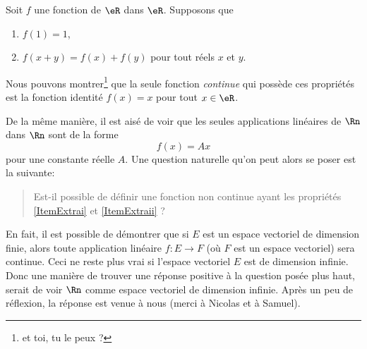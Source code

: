 Soit $f$ une fonction de $\eR$ dans $\eR$. Supposons que 
\begin{enumerate}

\item		\label{ItemExtrai}
$f(1)=1$,

\item		\label{ItemExtraii}
$f(x+y)=f(x)+f(y)$ pour tout réels $x$ et $y$.

\end{enumerate}
Nous pouvons montrer\footnote{et toi, tu le peux ?} que la seule fonction {\it continue} qui possède ces propriétés est la fonction identité $f(x)=x$ pour tout $x\in\eR$.

De la même manière, il est aisé de voir que les seules applications linéaires de $\Rn$ dans $\Rn$ sont de la forme 
\begin{equation}
	f(x)=Ax
\end{equation}
pour une constante réelle $A$. Une question naturelle qu'on peut alors se poser est la suivante: 
\begin{quote} 
	Est-il possible de définir une fonction non continue ayant les propriétés \ref{ItemExtrai} et \ref{ItemExtraii} ?
\end{quote}
En fait, il est possible de démontrer que si $E$ est un espace vectoriel de dimension finie, alors toute application linéaire $f:E\rightarrow  F$ (où $F$ est un espace vectoriel) sera continue. Ceci ne reste plus vrai si l'espace vectoriel $E$ est de dimension infinie. Donc une manière de trouver une réponse positive à la question posée plus haut, serait de voir $\Rn$ comme espace vectoriel de dimension infinie. Après un peu de réflexion, la réponse est venue à nous (merci à Nicolas et à Samuel). 


